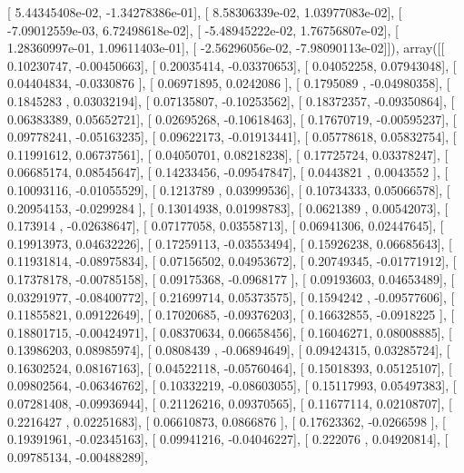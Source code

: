 \documentclass{article}
\begin{document}
       [  5.44345408e-02,  -1.34278386e-01],
       [  8.58306339e-02,   1.03977083e-02],
       [ -7.09012559e-03,   6.72498618e-02],
       [ -5.48945222e-02,   1.76756807e-02],
       [  1.28360997e-01,   1.09611403e-01],
       [ -2.56296056e-02,  -7.98090113e-02]]), array([[ 0.10230747, -0.00450663],
       [ 0.20035414, -0.03370653],
       [ 0.04052258,  0.07943048],
       [ 0.04404834, -0.0330876 ],
       [ 0.06971895,  0.0242086 ],
       [ 0.1795089 , -0.04980358],
       [ 0.1845283 ,  0.03032194],
       [ 0.07135807, -0.10253562],
       [ 0.18372357, -0.09350864],
       [ 0.06383389,  0.05652721],
       [ 0.02695268, -0.10618463],
       [ 0.17670719, -0.00595237],
       [ 0.09778241, -0.05163235],
       [ 0.09622173, -0.01913441],
       [ 0.05778618,  0.05832754],
       [ 0.11991612,  0.06737561],
       [ 0.04050701,  0.08218238],
       [ 0.17725724,  0.03378247],
       [ 0.06685174,  0.08545647],
       [ 0.14233456, -0.09547847],
       [ 0.0443821 ,  0.0043552 ],
       [ 0.10093116, -0.01055529],
       [ 0.1213789 ,  0.03999536],
       [ 0.10734333,  0.05066578],
       [ 0.20954153, -0.0299284 ],
       [ 0.13014938,  0.01998783],
       [ 0.0621389 ,  0.00542073],
       [ 0.173914  , -0.02638647],
       [ 0.07177058,  0.03558713],
       [ 0.06941306,  0.02447645],
       [ 0.19913973,  0.04632226],
       [ 0.17259113, -0.03553494],
       [ 0.15926238,  0.06685643],
       [ 0.11931814, -0.08975834],
       [ 0.07156502,  0.04953672],
       [ 0.20749345, -0.01771912],
       [ 0.17378178, -0.00785158],
       [ 0.09175368, -0.0968177 ],
       [ 0.09193603,  0.04653489],
       [ 0.03291977, -0.08400772],
       [ 0.21699714,  0.05373575],
       [ 0.1594242 , -0.09577606],
       [ 0.11855821,  0.09122649],
       [ 0.17020685, -0.09376203],
       [ 0.16632855, -0.0918225 ],
       [ 0.18801715, -0.00424971],
       [ 0.08370634,  0.06658456],
       [ 0.16046271,  0.08008885],
       [ 0.13986203,  0.08985974],
       [ 0.0808439 , -0.06894649],
       [ 0.09424315,  0.03285724],
       [ 0.16302524,  0.08167163],
       [ 0.04522118, -0.05760464],
       [ 0.15018393,  0.05125107],
       [ 0.09802564, -0.06346762],
       [ 0.10332219, -0.08603055],
       [ 0.15117993,  0.05497383],
       [ 0.07281408, -0.09936944],
       [ 0.21126216,  0.09370565],
       [ 0.11677114,  0.02108707],
       [ 0.2216427 ,  0.02251683],
       [ 0.06610873,  0.0866876 ],
       [ 0.17623362, -0.0266598 ],
       [ 0.19391961, -0.02345163],
       [ 0.09941216, -0.04046227],
       [ 0.222076  ,  0.04920814],
       [ 0.09785134, -0.00488289],
\end{document}
